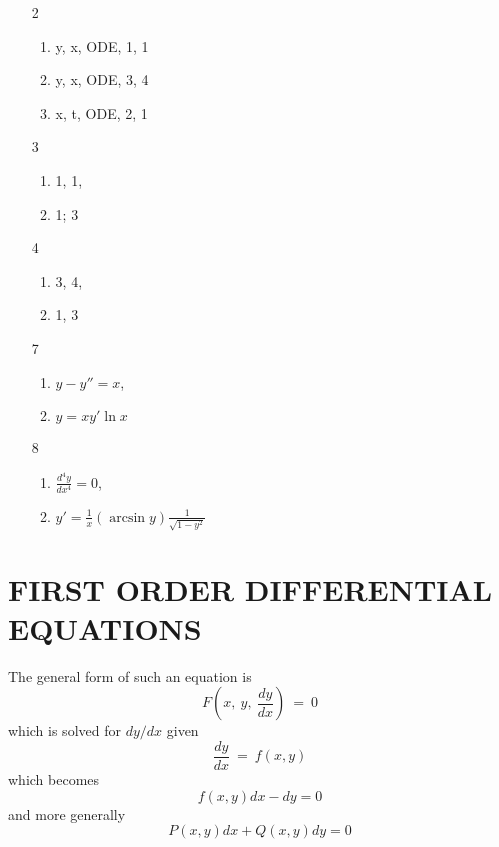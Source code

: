 \documentclass[11pt]{amsbook}
\begin{document}

\begin{enumerate}
\item[2]    
\begin{enumerate}
\item y, x, ODE, 1, 1 \item y, x, ODE, 3, 4 \item x, t, ODE, 2, 1
\end{enumerate}		
\item[3]    
\begin{enumerate}
\item 1, 1,  \item 1; 3
\end{enumerate}		
\item[4]    
\begin{enumerate}
\item 3, 4,  \item 1, 3
\end{enumerate}	
\item[7]    
\begin{enumerate}
\item $y - y'' = x$,  \item  $y = xy' \ln x$
\end{enumerate}
\item[8]    
\begin{enumerate}
\item $\frac{d^4y}{dx^4} = 0 $,   \item $ y' = \frac{1}{x}(\arcsin y) \frac{1}{\sqrt{1-y^2}}$
\end{enumerate}		
\end{enumerate}
\section{FIRST ORDER DIFFERENTIAL EQUATIONS}
\label{sec:FirstODE}
The general form of such an equation is 
\begin{equation}\label{page_355_eq:1}
F(x, \: y, \: \frac{dy}{dx}) \: = \: 0
\end{equation}
which is solved for $dy/dx$ given
\begin{equation}\label{page_355_eq:2}
\frac{dy}{dx} \: = \: f(x,y)
\end{equation}
which becomes 
\[
f(x,y)dx - dy = 0
\]
and more generally 
\begin{equation}\label{page_355_eq:3}
P(x,y)dx + Q(x,y)dy = 0
\end{equation}
\end{document}

